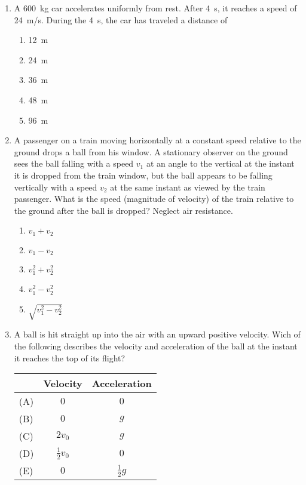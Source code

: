 \documentclass{../../oss-apphys}
\begin{document}
\begin{multicols}{2}
\begin{enumerate}[resume,leftmargin=18pt]
  \item A \SI{600}{\kilo\gram} car accelerates uniformly from rest. After
    \SI{4}{\second}, it reaches a speed of \SI{24}{m/s}. During the \SI{4}{\second},
    the car has traveled a distance of
      \begin{enumerate}[noitemsep,topsep=0pt,leftmargin=18pt,label=(\Alph*)]
      \item\SI{12}{\metre}
      \item\SI{24}{\metre}
      \item\SI{36}{\metre}
      \item\SI{48}{\metre}
      \item\SI{96}{\metre}
      \end{enumerate}
      \columnbreak
      
    \item A passenger on a train moving horizontally at a constant speed
      relative to the ground drops a ball from his window. A stationary
      observer on the ground sees the ball falling with a speed $v_1$ at an
      angle to the vertical at the instant it is dropped from the train window,
      but the ball appears to be falling vertically with a speed $v_2$ at the
      same instant as viewed by the train passenger. What is the speed
      (magnitude of velocity) of the train relative to the ground after the
      ball is dropped? Neglect air resistance.
      \begin{enumerate}[noitemsep,topsep=0pt,leftmargin=18pt,label=(\Alph*)]
      \item $ v_1 + v_2$
      \item $ v_1 - v_2$
      \item $ v_1^2 + v_2^2$
      \item $ v_1^2 - v_2^2$
      \item $\sqrt{v_1^2 - v_2^2}$
      \end{enumerate}
      
    \item A ball is hit straight up into the air with an upward positive
      velocity. Wich of the following describes the velocity and acceleration
      of the ball at the instant it reaches the top of its flight?
      \begin{tabular}{lcc}
        & Velocity & Acceleration\\ \hline
        (A) & $0$ & $0$\\
        (B) & $0$ & $g$\\
        (C) & $2v_0$ & $g$\\
        (D) & $\frac{1}{2}v_0$ & $0$\\
        (E) & $0$ & $\frac{1}{2}g$
      \end{tabular}
      

\end{enumerate}
\end{multicols}
\end{document}
